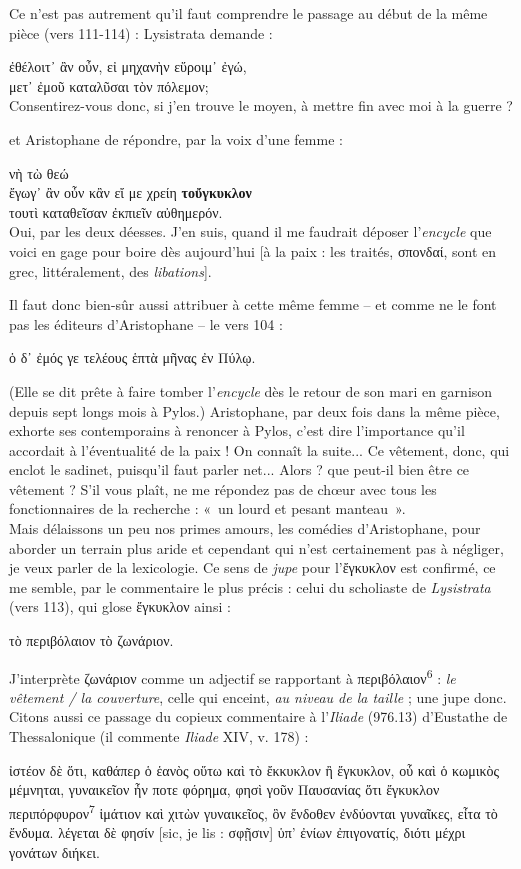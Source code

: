 \documentclass[12pt]{book}%
\newcommand{\italique}[1]{\textit{#1}}%
\newcommand{\citComm}[1]{\begin{quoting}[vskip=0pt] #1 \end{quoting}}%
\newcommand{\espace}[1]{\hspace{#1}}%
\newlength{\larg}%
\newcommand{\decalage}[1]{%
\settowidth{\larg}{#1}%
\espace{\larg}%
}
\newcommand{\marqueur}[1]{\textsuperscript{#1}}%
\newenvironment{groupe}{%
\pstart%
\ledgroup%
}{%
\pend %
}%
\begin{document}
\begin{pages}
\begin{Leftside}
\begin{groupe}
{{Ce n'est pas autrement qu'il faut comprendre le passage au début de la même pièce (vers 111-114) : Lysistrata demande : %
\citComm{ἐθέλοιτ᾽ ἂν οὖν, εἰ μηχανὴν εὕροιμ᾽ ἐγώ,\\
μετ᾽ ἐμοῦ καταλῦσαι τὸν πόλεμον;\\
Consentirez-vous donc, si j'en trouve le moyen, à mettre fin avec moi à la guerre ?}%
et Aristophane de répondre, par la voix d'une femme :%
\citComm{\decalage{μετ᾽ ἐμοῦ καταλῦσαι τὸν πόλεμον;}νὴ τὼ θεώ\\
ἔγωγ᾽ ἂν οὖν κἂν εἴ με χρείη \textbf{τοὔγκυκλον}\\
τουτὶ καταθεῖσαν ἐκπιεῖν αὐθημερόν.\\
Oui, par les deux déesses. J'en suis, quand il me faudrait déposer l'\italique{encycle} que voici en gage pour boire dès aujourd'hui [à la paix : les traités, σπονδαί, sont en grec, littéralement, des \italique{libations}].}%
Il faut donc bien-sûr aussi attribuer à cette même femme -- et comme ne le font pas les éditeurs d'Aristophane -- le vers 104 :%
\citComm{ὁ δ᾽ ἐμός γε τελέους ἑπτὰ μῆνας ἐν Πύλῳ.}%
(Elle se dit prête à faire tomber l'\italique{encycle} dès le retour de son mari en garnison depuis sept longs mois à Pylos.)
Aristophane, par deux fois dans la même pièce, exhorte ses contemporains à renoncer à Pylos, c'est dire l'importance qu'il accordait à l'éventualité de la paix ! On connaît la suite...
Ce vêtement, donc, qui enclot le sadinet, puisqu'il faut parler net... Alors ? que peut-il bien être ce vêtement ? S'il vous plaît, ne me répondez pas de chœur avec tous les fonctionnaires de la recherche : «~un lourd et pesant manteau~».\\
Mais délaissons un peu nos primes amours, les comédies d'Aristophane, pour aborder un terrain plus aride et cependant qui n'est certainement pas à négliger, je veux parler de la lexicologie.
Ce sens de \italique{jupe} pour l'ἔγκυκλον est confirmé, ce me semble, par le commentaire le plus précis : celui du scholiaste de \italique{Lysistrata} (vers 113), qui glose ἔγκυκλον ainsi :%
\citComm{τὸ περιβόλαιον τὸ ζωνάριον.}%
J'interprète ζωνάριον comme un adjectif se rapportant à περιβόλαιον\marqueur{6} : \italique{le vêtement / la couverture}, celle qui enceint, \italique{au niveau de la taille} ; une jupe donc. Citons aussi ce passage du copieux commentaire à l'\italique{Iliade} (976.13) d'Eustathe de Thessalonique (il commente \italique{Iliade} XIV, v. 178) :%
\citComm{ἰστέον δὲ ὅτι, καθάπερ ὁ ἑανὸς οὕτω καὶ τὸ ἔκκυκλον ἢ ἔγκυκλον, οὗ καὶ ὁ κωμικὸς μέμνηται, γυναικεῖον ἦν ποτε φόρημα, φησὶ γοῦν Παυσανίας ὅτι ἔγκυκλον περιπόρφυρον\marqueur{7} ἱμάτιον καὶ χιτὼν γυναικεῖος, ὃν ἔνδοθεν ἐνδύονται γυναῖκες, εἶτα τὸ ἔνδυμα. λέγεται δὲ φησίν [sic, je lis : σφῇσιν] ὑπ' ἐνίων ἐπιγονατίς, διότι μέχρι γονάτων διήκει.\\
}}}
\end{groupe}
\end{Leftside}
\end{pages}
\end{document}
